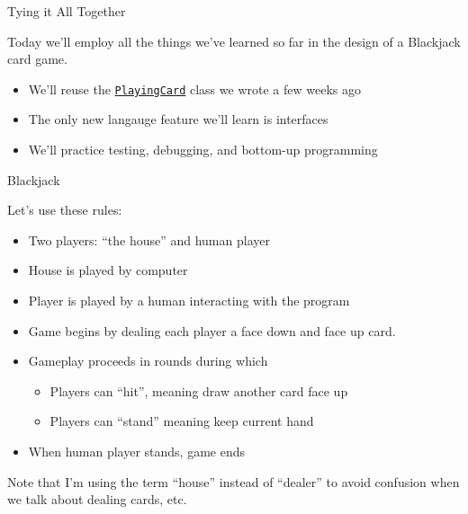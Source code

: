 \documentclass{beamer}
\author[Chris Simpkins] 
{Christopher Simpkins \\\texttt{chris.simpkins@gatech.edu}}
\institute[Georgia Tech] %
\date[CS 1331]{}
\newcommand{\code}{http://www.cc.gatech.edu/~simpkins/teaching/gatech/cs1331/code}
\begin{document}
\begin{frame}
  \titlepage
\end{frame}



\begin{frame}[fragile]{Tying it All Together}



Today we'll employ all the things we've learned so far in the design of a Blackjack card game.
\begin{itemize}
\item We'll reuse the \href{\code/PlayingCard.java}{{\tt PlayingCard}} class we wrote a few weeks ago
\item The only new langauge feature we'll learn is interfaces
\item We'll practice testing, debugging, and bottom-up programming
\end{itemize}


\end{frame}

\begin{frame}[fragile]{Blackjack}


Let's use these rules:
\begin{itemize}
\item Two players: ``the house'' and human player
\item House is played by computer
\item Player is played by a human interacting with the program
\item Game begins by dealing each player a face down and face up card.
\item Gameplay proceeds in rounds during which
\begin{itemize}
\item Players can ``hit'', meaning draw another card face up
\item Players can ``stand'' meaning keep current hand
\end{itemize}
\item When human player stands, game ends
\end{itemize}
Note that I'm using the term ``house'' instead of ``dealer'' to avoid confusion when we talk about dealing cards, etc.
\end{frame}
\end{document}
